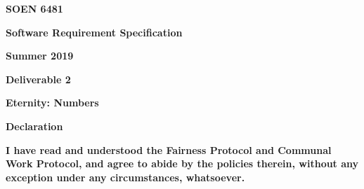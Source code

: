 \documentclass[12pt]{article}
\begin{document}
\begin{Center}
{\fontsize{16pt}{19.2pt}\selectfont \textbf{SOEN 6481}\par}
\end{Center}\par


\vspace{\baselineskip}
\begin{Center}
{\fontsize{16pt}{19.2pt}\selectfont \textbf{Software Requirement Specification}\par}
\end{Center}\par


\vspace{\baselineskip}
\begin{Center}
{\fontsize{16pt}{19.2pt}\selectfont \textbf{Summer 2019}\par}
\end{Center}\par


\vspace{\baselineskip}
\begin{Center}
{\fontsize{16pt}{19.2pt}\selectfont \textbf{Deliverable 2}\par}
\end{Center}\par


\vspace{\baselineskip}
\begin{Center}
{\fontsize{16pt}{19.2pt}\selectfont \textbf{Eternity: Numbers}\par}
\end{Center}\par


\vspace{\baselineskip}
\begin{Center}
{\fontsize{16pt}{19.2pt}\selectfont \textbf{Declaration}\par}
\end{Center}\par


\vspace{\baselineskip}
\begin{justify}
{\fontsize{16pt}{19.2pt}\selectfont \textbf{I have read and understood the Fairness Protocol and Communal Work Protocol, and agree to abide by the policies therein, without any exception under any circumstances, whatsoever.}\par}
\end{justify}\par
\end{document}

